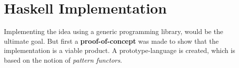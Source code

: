 \section{Haskell Implementation}

Implementing the idea using a generic programming library, would be the ultimate goal. But first a \textbf{proof-of-concept} was made to show that the implementation is a viable product. A prototype-language is created, which is based on the notion of \textit{pattern functors}.











